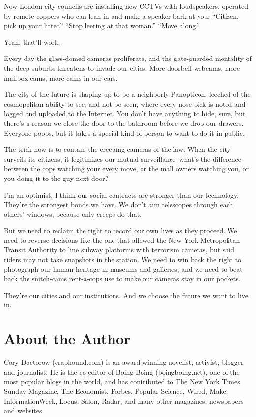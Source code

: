 Now London city councils are installing new CCTVs with
loudspeakers, operated by remote coppers who can lean in and make a
speaker bark at you, ``Citizen, pick up your litter.'' ``Stop leering
at that woman.'' ``Move along.''

Yeah, that'll work.

Every day the glass-domed cameras proliferate, and the gate-guarded
mentality of the deep suburbs threatens to invade our cities. More
doorbell webcams, more mailbox cams, more cams in our cars.

The city of the future is shaping up to be a neighborly Panopticon,
leeched of the cosmopolitan ability to see, and not be seen, where
every nose pick is noted and logged and uploaded to the Internet.
You don't have anything to hide, sure, but there's a reason we
close the door to the bathroom before we drop our drawers. Everyone
poops, but it takes a special kind of person to want to do it in
public.

The trick now is to contain the creeping cameras of the law. When
the city surveils its citizens, it legitimizes our mutual
surveillance--what's the difference between the cops watching your
every move, or the mall owners watching you, or you doing it to the
guy next door?

I'm an optimist. I think our social contracts are stronger than our
technology. They're the strongest bonds we have. We don't aim
telescopes through each others' windows, because only creeps do
that.

But we need to reclaim the right to record our own lives as they
proceed. We need to reverse decisions like the one that allowed the
New York Metropolitan Transit Authority to line subway platforms
with terrorism cameras, but said riders may not take snapshots in
the station. We need to win back the right to photograph our human
heritage in museums and galleries, and we need to beat back the
snitch-cams rent-a-cops use to make our cameras stay in our
pockets.

They're our cities and our institutions. And we choose the future
we want to live in.

\section{About the Author}

Cory Doctorow (craphound.com) is an award-winning novelist,
activist, blogger and journalist. He is the co-editor of Boing
Boing (boingboing.net), one of the most popular blogs in the world,
and has contributed to The New York Times Sunday Magazine, The
Economist, Forbes, Popular Science, Wired, Make, InformationWeek,
Locus, Salon, Radar, and many other magazines, newspapers and
websites.

